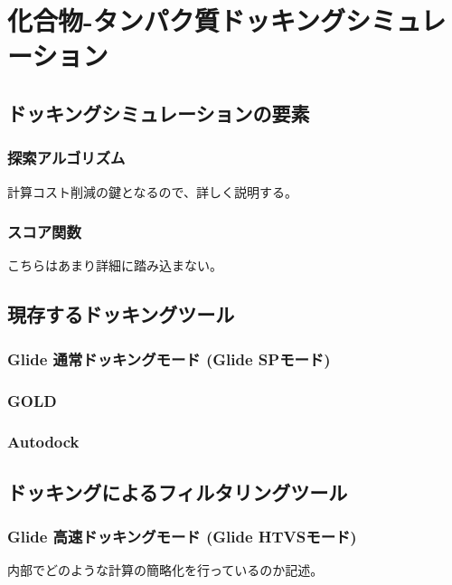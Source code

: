 \chapter{化合物-タンパク質ドッキングシミュレーション}

\section{ドッキングシミュレーションの要素}
\subsection{探索アルゴリズム}
計算コスト削減の鍵となるので、詳しく説明する。
\subsection{スコア関数}
こちらはあまり詳細に踏み込まない。

\section{現存するドッキングツール}
\subsection{Glide 通常ドッキングモード (Glide SPモード)}
\subsection{GOLD}
\subsection{Autodock}

\section{ドッキングによるフィルタリングツール}
\subsection{Glide 高速ドッキングモード (Glide HTVSモード)}
内部でどのような計算の簡略化を行っているのか記述。

